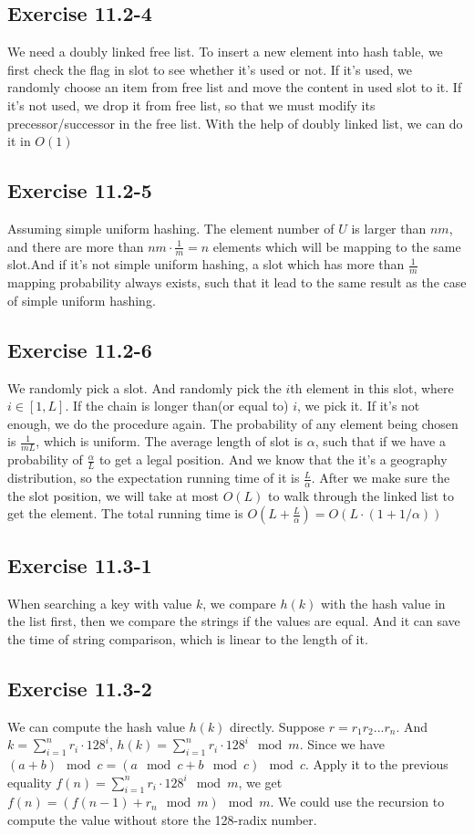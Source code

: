 \documentclass[12pt]{article}
\theoremstyle{definition}
\theoremstyle{remark}
\begin{document}
\subsection*{Exercise 11.2-4}
We need a doubly linked free list. To insert a new element into hash table, we first check the flag in slot to see whether it's used or not. If it's used, we randomly choose an item from free list and move the content in used slot to it. If it's not used, we drop it from free list, so that we must modify its precessor/successor in the free list. With the help of doubly linked list, we can do it in $O(1)$
\subsection*{Exercise 11.2-5}
Assuming simple uniform hashing. The element number of $U$ is larger than $nm$, and there are more than $nm\cdot\frac{1}{m}=n$ elements which will be mapping to the same slot.And if it's not simple uniform hashing, a slot which has more than $\frac{1}{m}$ mapping probability always exists, such that it lead to the same result as the case of simple uniform hashing.
\subsection*{Exercise 11.2-6}
We randomly pick a slot. And randomly pick the $i$th element in this slot, where $i\in[1,L]$. If the chain is longer than(or equal to) $i$, we pick it. If it's not enough, we do the procedure again. The probability of any element being chosen is $\frac{1}{mL}$, which is uniform. The average length of slot is $\alpha$, such that if we have a probability of $\frac{\alpha}{L}$ to get a legal position. And we know that the it's a geography distribution, so the expectation running time of it is $\frac{L}{\alpha}$. After we make sure the the slot position, we will take at most $O(L)$ to walk through the linked list to get the element. The total running time is $O(L+\frac{L}{\alpha})=O(L\cdot(1+1/\alpha))$
\subsection*{Exercise 11.3-1}
When searching a key with value $k$, we compare $h(k)$ with the hash value in the list first, then we compare the strings if the values are equal. And it can save the time of string comparison, which is linear to the length of it.
\subsection*{Exercise 11.3-2}
We can compute the hash value $h(k)$ directly. Suppose $r=r_1r_2...r_n$. And $k=\sum_{i=1}^nr_i\cdot128^i$, $h(k)=\sum_{i=1}^nr_i\cdot128^i\mod{m}$. Since we have $(a+b)\mod{c}=(a\mod{c}+b\mod{c})\mod{c}$. Apply it to the previous equality $f(n)=\sum_{i=1}^nr_i\cdot128^i\mod{m}$, we get $f(n)=(f(n-1)+r_n\mod{m})\mod{m}$. We could use the recursion to compute the value without store the 128-radix number.
\end{document}
